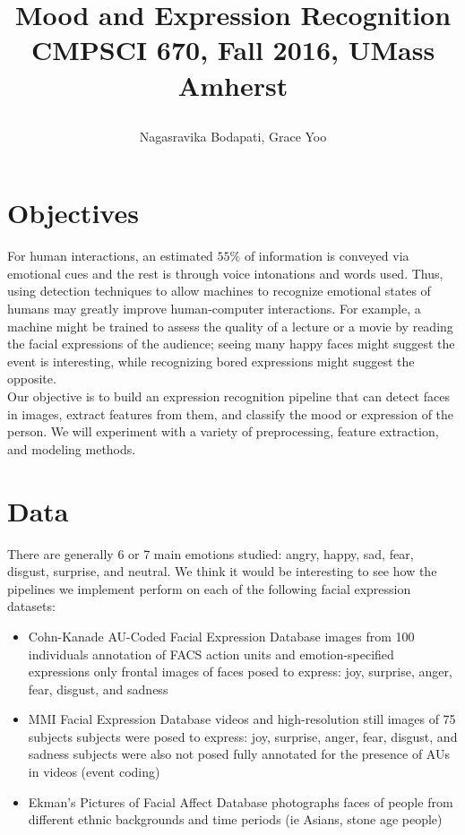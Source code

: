 \documentclass[10pt,letterpaper]{article}
\title{
  \textbf{Mood and Expression Recognition} \\
  \Large{CMPSCI 670, Fall 2016, UMass Amherst} \\
  \author{Nagasravika Bodapati, Grace Yoo}
}
\date{}
\begin{document}
\maketitle

\section{Objectives}
For human interactions, an estimated $55\%$ of information is conveyed via emotional cues and the rest is through voice intonations and words used. Thus, using detection techniques to allow machines to recognize emotional states of humans may greatly improve human-computer interactions. For example, a machine might be trained to assess the quality of a lecture or a movie by reading the facial expressions of the audience; seeing many happy faces might suggest the event is interesting, while recognizing bored expressions might suggest the opposite.  \\

\noindent Our objective is to build an expression recognition pipeline that can detect faces in images, extract features from them, and classify the mood or expression of the person. We will experiment with a variety of preprocessing, feature extraction, and modeling methods.

\section{Data}
There are generally 6 or 7 main emotions studied: angry, happy, sad, fear, disgust, surprise, and neutral. We think it would be interesting to see how the pipelines we implement perform on each of the following facial expression datasets:
\begin{itemize}
\item Cohn-Kanade AU-Coded Facial Expression Database \cite{cohn}
 images from 100 individuals
\subitem annotation of FACS action units and emotion-specified expressions
\subitem only frontal images of faces posed to express: joy, surprise, anger, fear, disgust, and sadness
\item MMI Facial Expression Database \cite{mmi}
 videos and high-resolution still images of 75 subjects
\subitem subjects were posed to express: joy, surprise, anger, fear, disgust, and sadness
\subitem subjects were also not posed
\subitem fully annotated for the presence of AUs in videos (event coding)
\item Ekman's Pictures of Facial Affect Database \cite{ekman} 
 photographs
\subitem faces of people from different ethnic backgrounds and time periods (ie Asians, stone age people)
\end{itemize}
\end{document}
